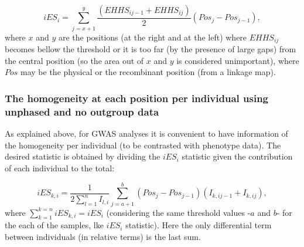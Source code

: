 \documentclass[a4paper,11pt]{article}
\begin{document}
 \begin{equation}
 iES_i = \sum_{j=x+1}^{y}\frac{(EHHS_{ij-1} + EHHS_{ij})}{2} (Pos_{j} - Pos_{j-1}),
 \end{equation}
where $x$ and $y$ are the positions (at the right and at the left) where $EHHS_{ij}$ becomes bellow the threshold or it is too far (by the presence of large gaps) from the central position (so the area out of $x$ and $y$ is considered unimportant), where $Pos$ may be the physical or the recombinant position (from a linkage map).
 
\subsubsection{The homogeneity at each position per individual using unphased and no outgroup data}
As explained above, for GWAS analyses it is convenient to have information of the homogeneity per individual (to be contrasted with phenotype data). The desired  statistic is obtained by dividing the $iES_i$ statistic given the contribution of each individual to the total:

 \begin{equation}
 iES_{k,i} = \frac{1}{2\sum_{l=1}^{n}I_{l,i}} \sum_{j=a+1}^{b} (Pos_{j} - Pos_{j-1}) (I_{k,ij-1} + I_{k,ij}),
 \end{equation}
where $\sum_{k=1}^{k=n}iES_{k,i}=iES_i$ (considering the same threshold values -$a$ and $b$- for the each of the samples, lke $iES_i$ statistic). Here the only differential term between individuals (in relative terms) is the last sum. %


\end{document}
